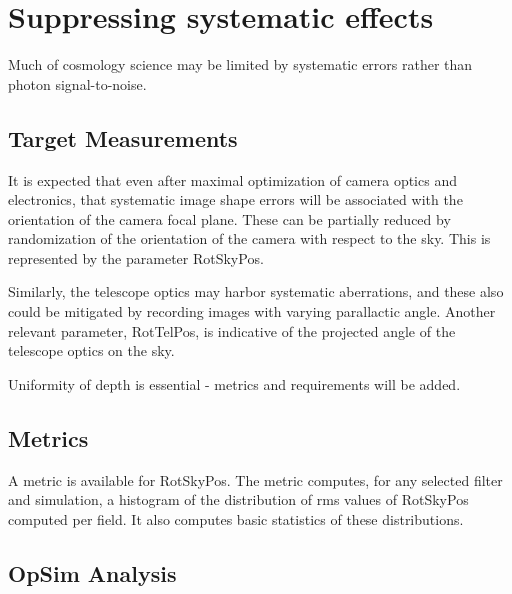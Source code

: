 \section{Suppressing systematic effects}
\def\secname{suppressing}\label{sec:\secname}


Much of cosmology science may be limited by systematic errors rather than photon signal-to-noise.  

\subsection{Target Measurements}

It is expected that even after maximal optimization of camera optics and electronics, that systematic image shape errors will be associated with the orientation of the camera focal plane.  These can be partially reduced by randomization of the orientation of the camera with respect to the sky.  This is represented by the parameter RotSkyPos.  

Similarly, the telescope optics may harbor systematic aberrations, and these also could be mitigated by recording images with varying parallactic angle.  Another relevant parameter, RotTelPos, is indicative of the projected angle of the telescope optics on the sky.  

Uniformity of depth is essential - metrics and requirements will be added.


\subsection{Metrics}

A metric is available for RotSkyPos.  The metric computes, for any selected filter and simulation, a histogram of the distribution of rms values of RotSkyPos computed per field. It also computes basic statistics of these distributions.

\subsection{OpSim Analysis}


